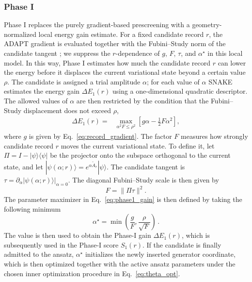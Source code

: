 \documentclass[
  reprint,
  amsmath,
  amssymb,
  aps,
  pra,
  nofootinbib,
  superscriptaddress,
  floatfix
]{revtex4-2}
\newcommand{\ket}[1]{|#1\rangle}
\newcommand{\bra}[1]{\langle #1|}
\begin{document}
\subsubsection{Phase I}
%
\noindent
Phase I replaces the purely gradient-based prescreening with a geometry-normalized local energy gain estimate. For a fixed candidate record \(r\), the ADAPT gradient is evaluated together with the Fubini--Study norm of the candidate tangent \cite{Nocedal2006TrustRegion}; we suppress the \(r\)-dependence of \(g\), \(F\), \(\tau\), and \(\alpha^\star\) in this local model. In this way, Phase I estimates how much the candidate record \(r\) can lower the energy before it displaces the current variational state beyond a certain value \(\rho\). The candidate is assigned a trial amplitude \(\alpha\); for each value of \(\alpha\) \textsc{SNAKE} estimates the energy gain \(\Delta E_{1}(r)\) using a one-dimensional quadratic descriptor. The allowed values of \(\alpha\) are then restricted by the condition that the Fubini--Study displacement does not exceed \(\rho\),
%
\begin{equation}
\begin{split}
\Delta E_{1}(r)={}&\max_{\alpha^2F\le \rho^2} \left[g\alpha-\frac{1}{2}F\alpha^2\right],
\end{split}
\label{eq:phase1_gain}
\end{equation}
%
where \(g\) is given by Eq.~\eqref{eq:record_gradient}. The factor \(F\) measures how strongly candidate record \(r\) moves the current variational state. To define it, let \(\Pi=I-\ket{\psi}\bra{\psi}\) be the projector onto the subspace orthogonal to the current state, and let \(\ket{\psi(\alpha;r)}=e^{\alpha\widetilde A_r}\ket{\psi}\). The candidate tangent is \(\tau=\left.\partial_\alpha\ket{\psi(\alpha;r)}\right|_{\alpha=0}\). The diagonal Fubini--Study scale is then given by
%
\begin{equation*}
F=\|\Pi\tau\|^2.
\end{equation*}
%
The parameter maximizer in Eq.~\eqref{eq:phase1_gain} is then defined by taking the following minimum
\begin{equation}
\alpha^\star
=
\min\!\left(
\dfrac{g}{F},
\dfrac{\rho}{\sqrt{F}}
\right)\,.
\label{eq:phase1_alpha_star}
\end{equation}
The value is then used to obtain the Phase-I gain \(\Delta E_1(r)\), which is subsequently used in the Phase-I score \(S_1(r)\). If the candidate is finally admitted to the ansatz, \(\alpha^\star\) initializes the newly inserted generator coordinate, which is then optimized together with the active ansatz parameters under the chosen inner optimization procedure in Eq.~\eqref{eq:theta_opt}.
\end{document}
